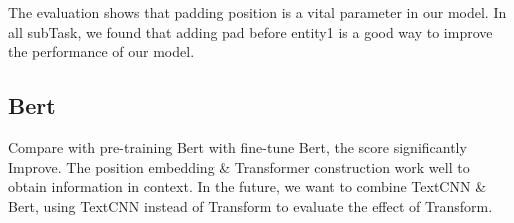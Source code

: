 The evaluation shows that padding position is a vital parameter in our model. In all subTask, we found that adding pad before entity1 is a good way to improve the performance of our model.

\subsection{Bert}
\label{sec:bert}

Compare with pre-training Bert with fine-tune Bert, the score significantly Improve. The position embedding \& Transformer construction work well to obtain information in context. In the future, we want to combine TextCNN \& Bert, using TextCNN instead of Transform to evaluate the effect of Transform. 

